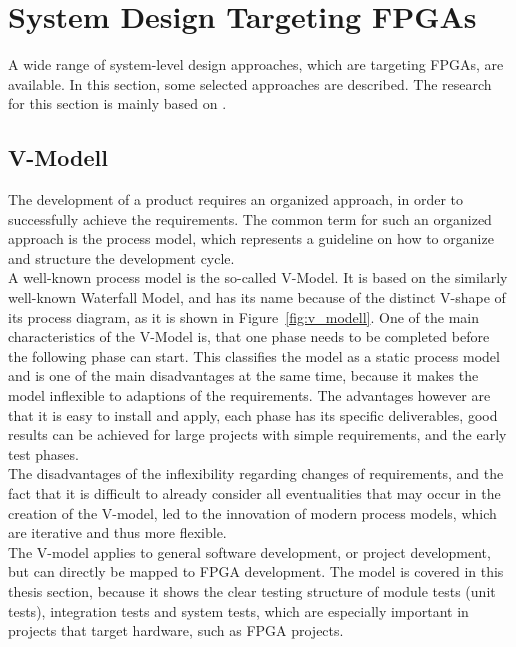 \section{System Design Targeting FPGAs}

A wide range of system-level design approaches, which are targeting FPGAs, are available.
In this section, some selected approaches are described.
The research for this section is mainly based on \cite{GesslerRalf2014EES}.

\subsection{V-Modell}

The development of a product requires an organized approach, in order to successfully achieve the requirements.
The common term for such an organized approach is the process model, which represents a guideline on how to organize and structure the development cycle.\\

A well-known process model is the so-called V-Model.
It is based on the similarly well-known Waterfall Model, and has its name because of the distinct V-shape of its process diagram, as it is shown in Figure~\ref{fig:v_modell}.
One of the main characteristics of the V-Model is, that one phase needs to be completed before the following phase can start.
This classifies the model as a static process model and is one of the main disadvantages at the same time, because it makes the model inflexible to adaptions of the requirements.
The advantages however are that it is easy to install and apply, each phase has its specific deliverables, good results can be achieved for large projects with simple requirements, and the early test phases.\\

The disadvantages of the inflexibility regarding changes of requirements, and the fact that it is difficult to already consider all eventualities that may occur in the creation of the V-model, led to the innovation of modern process models, which are iterative and thus more flexible.\\

The V-model applies to general software development, or project development, but can directly be mapped to FPGA development.
The model is covered in this thesis section, because it shows the clear testing structure of module tests (unit tests), integration tests and system tests, which are especially important in projects that target hardware, such as FPGA projects.\\

